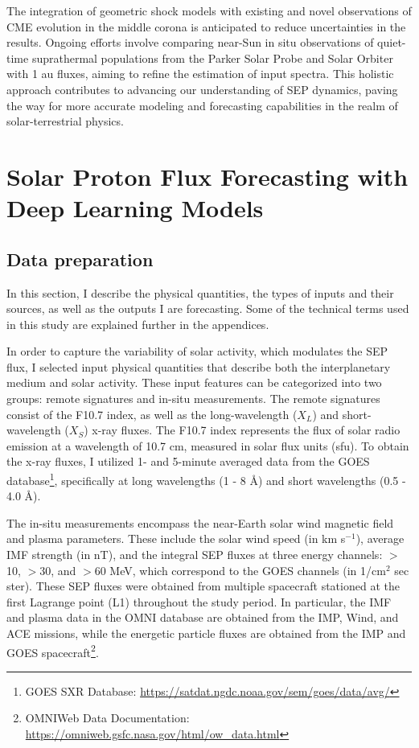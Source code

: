 The integration of geometric shock models with existing and novel observations of CME evolution in the middle corona is anticipated to reduce uncertainties in the results. Ongoing efforts involve comparing near-Sun in situ observations of quiet-time suprathermal populations from the Parker Solar Probe and Solar Orbiter with 1 au fluxes, aiming to refine the estimation of input spectra. This holistic approach contributes to advancing our understanding of SEP dynamics, paving the way for more accurate modeling and forecasting capabilities in the realm of solar-terrestrial physics.


\section{Solar Proton Flux Forecasting with Deep Learning Models}
\subsection{Data preparation}
In this section, I describe the physical quantities, the types of inputs and their sources, as well as the outputs I are forecasting. Some of the technical terms used in this study are explained further in the appendices.

In order to capture the variability of solar activity, which modulates the SEP flux, I selected input physical quantities that describe both the interplanetary medium and solar activity. These input features can be categorized into two groups: remote signatures and in-situ measurements.
The remote signatures consist of the F10.7 index, as well as the long-wavelength ($X_L$) and short-wavelength ($X_S$) x-ray fluxes. The F10.7 index represents the flux of solar radio emission at a wavelength of 10.7 cm, measured in solar flux units (sfu). To obtain the x-ray fluxes, I utilized 1- and 5-minute averaged data from the GOES database\footnote{GOES SXR Database: \url{https://satdat.ngdc.noaa.gov/sem/goes/data/avg/}}, specifically at long wavelengths (1 - 8 \AA) and short wavelengths (0.5 - 4.0 \AA).

The in-situ measurements encompass the near-Earth solar wind magnetic field and plasma parameters. These include the solar wind speed (in km s$^{-1}$), average IMF strength (in nT), and the integral SEP fluxes at three energy channels: $>$10, $>$30, and $>$60 MeV, which correspond to the GOES channels (in 1/cm$^2$ sec ster). These SEP fluxes were obtained from multiple spacecraft stationed at the first Lagrange point (L1) throughout the study period.
In particular, the IMF and plasma data in the OMNI database are obtained from the IMP, Wind, and ACE missions, while the energetic particle fluxes are obtained from the IMP and GOES spacecraft\footnote{OMNIWeb Data Documentation: \url{https://omniweb.gsfc.nasa.gov/html/ow_data.html}}.

